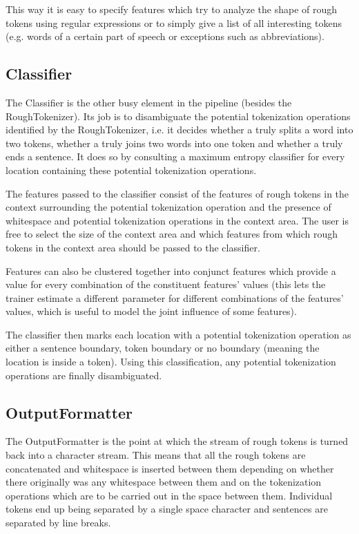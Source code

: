 This way it is easy to specify features which try to analyze the shape
of rough tokens using regular expressions or to simply give a list of
all interesting tokens (e.g. words of a certain part of speech or
exceptions such as abbreviations).

\subsection{Classifier}

The Classifier is the other busy element in the pipeline (besides the
RoughTokenizer). Its job is to disambiguate the potential tokenization
operations identified by the RoughTokenizer, i.e. it decides whether a
\maysplit{} truly splits a word into two tokens, whether a \mayjoin{}
truly joins two words into one token and whether a \maybreaksentence{}
truly ends a sentence. It does so by consulting a maximum entropy
classifier for every location containing these potential tokenization
operations.

The features passed to the classifier consist of the features of rough
tokens in the context surrounding the potential tokenization operation
and the presence of whitespace and potential tokenization operations
in the context area. The user is free to select the size of the
context area and which features from which rough tokens in the context
area should be passed to the classifier.

Features can also be clustered together into conjunct features which
provide a value for every combination of the constituent features'
values (this lets the trainer estimate a different parameter for
different combinations of the features' values, which is useful to
model the joint influence of some features).

The classifier then marks each location with a potential tokenization
operation as either a sentence boundary, token boundary or no boundary
(meaning the location is inside a token). Using this classification,
any potential tokenization operations are finally disambiguated.

\subsection{OutputFormatter}

The OutputFormatter is the point at which the stream of rough tokens
is turned back into a character stream. This means that all the rough
tokens are concatenated and whitespace is inserted between them
depending on whether there originally was any whitespace between them
and on the tokenization operations which are to be carried out in the
space between them. Individual tokens end up being separated by a
single space character and sentences are separated by line breaks.

